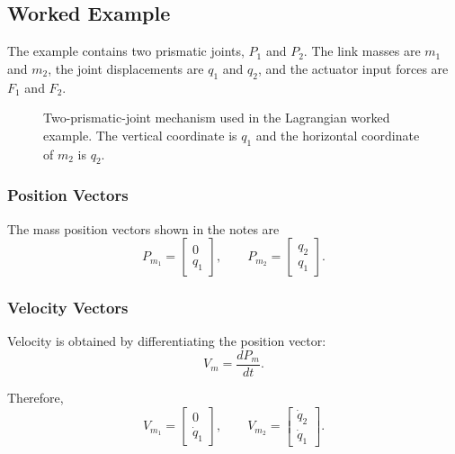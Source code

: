 \documentclass[11pt]{article}
\begin{document}
\subsection{Worked Example}

The example contains two prismatic joints, $P_1$ and $P_2$. The link masses are $m_1$ and $m_2$, the joint displacements are $q_1$ and $q_2$, and the actuator input forces are $F_1$ and $F_2$.

\begin{figure}[ht]
\centering
{}
\caption{Two-prismatic-joint mechanism used in the Lagrangian worked example. The vertical coordinate is $q_1$ and the horizontal coordinate of $m_2$ is $q_2$.}
\end{figure}

\subsubsection{Position Vectors}

The mass position vectors shown in the notes are
\[
P_{m_1}
=
\begin{bmatrix}
0\\
q_1
\end{bmatrix},
\qquad
P_{m_2}
=
\begin{bmatrix}
q_2\\
q_1
\end{bmatrix}.
\]

\subsubsection{Velocity Vectors}

Velocity is obtained by differentiating the position vector:
\[
V_m=\frac{dP_m}{dt}.
\]

Therefore,
\[
V_{m_1}
=
\begin{bmatrix}
0\\
\dot q_1
\end{bmatrix},
\qquad
V_{m_2}
=
\begin{bmatrix}
\dot q_2\\
\dot q_1
\end{bmatrix}.
\]
\end{document}
